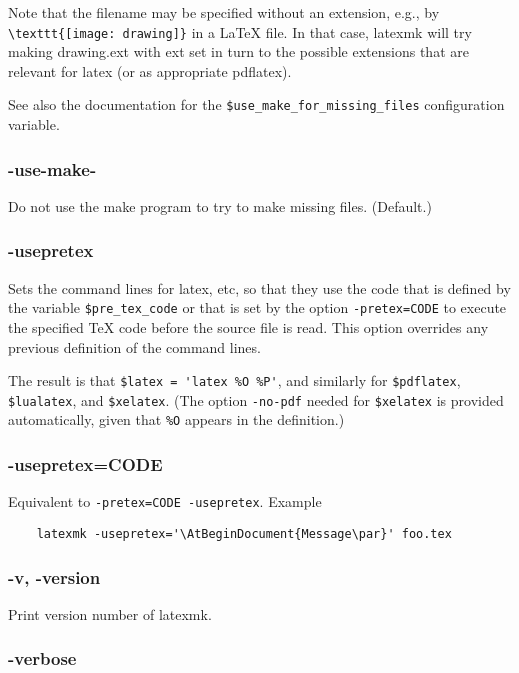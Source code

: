 Note  that  the  filename may be specified without an extension, e.g., by
\verb|\texttt{[image: drawing]}| in a  LaTeX  file.   In  that case,  latexmk  will
try making drawing.ext with ext set in turn to the possible extensions that are
relevant for  latex  (or  as appropriate pdflatex).

See  also  the documentation for the \verb|$use_make_for_missing_files| configuration
variable.


\subsubsection{-use-make-}

Do not use the make program to try to make missing files.   (Default.)


\subsubsection{-usepretex}

Sets the command lines for latex, etc, so that they use the code that is
defined by the variable \verb|$pre_tex_code| or that is set  by the option
\verb|-pretex=CODE| to execute the specified TeX code before the source file is read.
This  option  overrides  any  previous definition of the command lines.

The  result  is  that  \verb|$latex = 'latex %O %P'|, and similarly for
\verb|$pdflatex|, \verb|$lualatex|, and \verb|$xelatex|.  (The option \verb|-no-pdf|  needed
for \verb|$xelatex| is provided automatically, given that \verb|%O| appears in
the definition.)


\subsubsection{-usepretex=CODE}

Equivalent to \verb|-pretex=CODE -usepretex|.  Example

\begin{verbatim}
	latexmk -usepretex='\AtBeginDocument{Message\par}' foo.tex
\end{verbatim}

\subsubsection{-v, -version}

Print version number of latexmk.

\subsubsection{-verbose}

